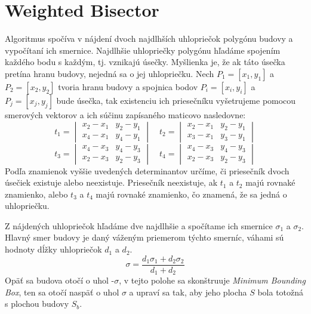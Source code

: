\documentclass[11pt]{article}
\begin{document}
\section{Weighted Bisector}\label{bi}
Algoritmus spočíva v nájdení dvoch najdlhších uhlopriečok polygónu budovy a vypočítaní ich smernice. Najdlhšie uhlopriečky polygónu hľadáme spojením každého bodu s každým, tj. vznikajú úsečky. Myšlienka je, že ak táto úsečka pretína hranu budovy, nejedná sa o jej uhlopriečku. \newline
Nech $P_1 = [x_1, y_1]$ a $P_2 = [x_2, y_2]$ tvoria hranu budovy a spojnica bodov $P_i = [x_i, y_i]$ a $P_j = [x_j, y_j]$ bude úsečka, tak existenciu ich priesečníku vyšetrujeme pomocou smerových vektorov a ich súčinu zapísaného maticovo nasledovne: 
\begin{equation*}
t_1=\begin{vmatrix} x_2 - x_1 & y_2 - y_1 \\ x_4 - x_1 & y_4 - y_1 \end{vmatrix} \quad
t_2=\begin{vmatrix} x_2 - x_1 & y_2 - y_1 \\ x_3 - x_1 & y_3 - y_1 \end{vmatrix}
\end{equation*}
\begin{equation*}
t_3=\begin{vmatrix} x_4 - x_3 & y_4 - y_3 \\ x_2 - x_3 & y_2 - y_3 \end{vmatrix} \quad
t_4=\begin{vmatrix} x_4 - x_3 & y_4 - y_3 \\ x_2 - x_3 & y_2 - y_3 \end{vmatrix}
\end{equation*}
Podľa znamienok vyššie uvedených determinantov určíme, či priesečník dvoch úsečiek existuje alebo neexistuje. Priesečník neexistuje, ak $t_1$ a $t_2$ majú rovnaké znamienko, alebo $t_3$ a $t_4$ majú rovnaké znamienko, čo znamená, že sa jedná o uhlopriečku.

Z nájdených uhlopriečok hľadáme dve najdlhšie a spočítame ich smernice $\sigma_1$ a $\sigma_2$. Hlavný smer budovy je daný váženým priemerom týchto smerníc, váhami sú hodnoty dĺžky uhlopriečok $d_1$ a $d_2$.
\begin{equation*}
\sigma = \frac{d_1\sigma_1 + d_2\sigma_2}{d_1 + d_2}
\end{equation*}
Opäť sa budova otočí o uhol -$\sigma$, v tejto polohe sa skonštruuje \textit{Minimum Bounding Box}, ten sa otočí naspäť o uhol $\sigma$ a upraví sa tak, aby jeho plocha $S$ bola totožná s plochou budovy $S_b$.
\end{document}
